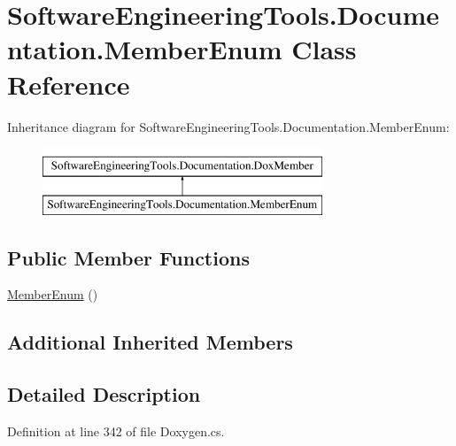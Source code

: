\hypertarget{class_software_engineering_tools_1_1_documentation_1_1_member_enum}{\section{Software\+Engineering\+Tools.\+Documentation.\+Member\+Enum Class Reference}
\label{class_software_engineering_tools_1_1_documentation_1_1_member_enum}
}
Inheritance diagram for Software\+Engineering\+Tools.\+Documentation.\+Member\+Enum\+:\begin{figure}[H]
\begin{center}
\leavevmode
\includegraphics[height=2.000000cm]{class_software_engineering_tools_1_1_documentation_1_1_member_enum}
\end{center}
\end{figure}
\subsection*{Public Member Functions}
\begin{DoxyCompactItemize}
\item 
\hyperlink{class_software_engineering_tools_1_1_documentation_1_1_member_enum_a4927d56af27eaf1216151983d8589169}{Member\+Enum} ()
\end{DoxyCompactItemize}
\subsection*{Additional Inherited Members}


\subsection{Detailed Description}


Definition at line 342 of file Doxygen.\+cs.



